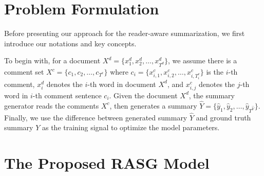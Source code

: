 \documentclass[letterpaper]{article} %
\begin{document}
\section{Problem Formulation}
\label{sec:formulation}

Before presenting our approach for the reader-aware summarization, we first introduce our notations and key concepts.


To begin with, for a document $X^d=\{x^d_1, x^d_2, \dots, x^d_{T^d}\}$, we assume there is a comment set $X^c=\{c_1, c_2, \dots, c_{T^c}\}$ where $c_i = \{x^c_{i,1}, x^c_{i,2}, \dots, x^c_{i,T^c_{i}}\}$ is the $i$-th comment, $x^d_i$ denotes the $i$-th word in document $X^d$, and $x^c_{i,j}$ denotes the $j$-th word in $i$-th comment sentence $c_i$.
Given the document $X^d$, the summary generator reads the comments $X^c$, then generates a summary $\hat{Y} = \{\hat{y}_1, \hat{y}_2, \dots, \hat{y}_{T^{\hat{Y}}}\}$.
Finally, we use the difference between generated summary $\hat{Y}$ and ground truth summary $Y$ as the training signal to optimize the model parameters.

\section{The Proposed RASG Model}
\end{document}

